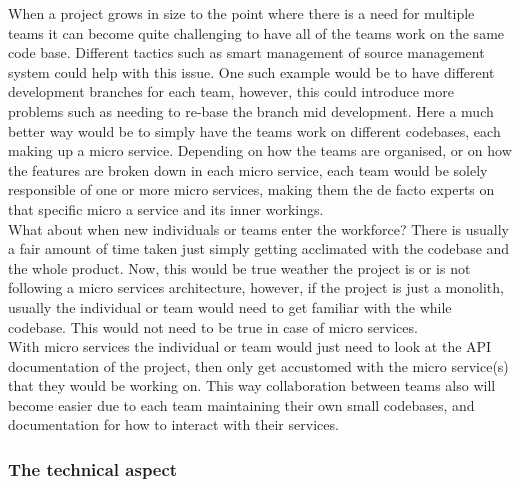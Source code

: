 \documentclass{article}
\newcommand{\vspaceconst}{-2ex}
\begin{document}
\begin{multicols}{2}
When a project grows in size to the point where there is a need for multiple teams it can become quite challenging to have all of the teams work on the same code base. Different tactics such as smart management of source management system could help with this issue. One such example would be to have different development branches for each team, however, this could introduce more problems such as needing to re-base the branch mid development. Here a much better way would be to simply have the teams work on different codebases, each making up a micro service. Depending on how the teams are organised, or on how the features are broken down in each micro service, each team would be solely responsible of one or more micro services, making them the de facto experts on that specific micro a service and its inner workings.\\
What about when new individuals or teams enter the workforce? There is usually a fair amount of time taken just simply getting acclimated with the codebase and the whole product. Now, this would be true weather the project is or is not following a micro services architecture, however, if the project is just a monolith, usually the individual or team would need to get familiar with the while codebase. This would not need to be true in case of micro services.\\
With micro services the individual or team would just need to look at the API documentation of the project, then only get accustomed with the micro service(s) that they would be working on. This way collaboration between teams also will become easier due to each team maintaining their own small codebases, and documentation for how to interact with their services.\\

\subsubsection{The technical aspect}
\vspace{\vspaceconst}


\end{multicols}
\end{document}
